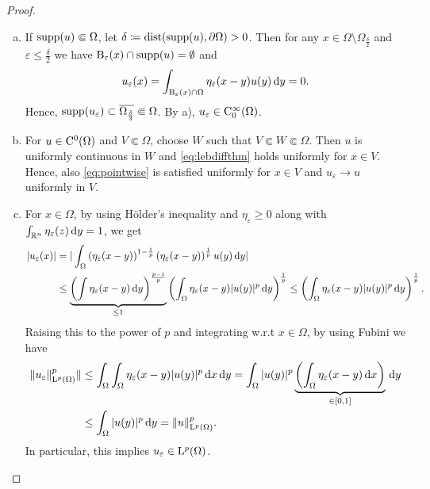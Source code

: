 \begin{proof}
\begin{enumerate}[a)]
    \item If $\operatorname{supp}(u) \Subset \Omega$, let $\delta \coloneqq \operatorname{dist}(\operatorname{supp}(u), \partial \Omega) > 0$.
    Then for any $x \in \Omega \setminus \Omega_{\frac{\delta}{2}}$ and $\varepsilon \leq \frac{\delta}{2}$ we have $\mathrm{B}_\varepsilon(x) \cap \operatorname{supp}(u) = \emptyset$ and 
    $$
    u_\varepsilon(x) = \int_{\mathrm{B}_\varepsilon(x) \cap \Omega} \eta_\varepsilon(x - y) u(y) \, {\operatorname{d}\!{y}} = 0.
    $$
    Hence, $\operatorname{supp}(u_\varepsilon) \subset \overline{\Omega_{\frac{\delta}{3}}} \Subset \Omega$.
    By a), $u_\varepsilon \in \mathrm{C}_0^\infty(\Omega)$.

    \item For $u \in \mathrm{C}^0(\Omega)$ and $V \Subset \Omega$, choose $W$ such that $V \Subset W \Subset \Omega$.
    Then $u$ is uniformly continuous in $W$ and \eqref{eq:lebdiffthm} holds uniformly for $x \in V$.
    Hence, also \eqref{eq:pointwise} is satisfied uniformly for $x \in V$ and $u_\varepsilon \to u$ uniformly in $V$.

    \item For $x \in \Omega$, by using Hölder's inequality and $\eta_\varepsilon \geq 0$ along with $\int_{\mathbb{R}^n} \eta_\varepsilon(z) \, {\operatorname{d}\!{y}} = 1$, we get
    \begin{align*}
      |u_\varepsilon(x)| 
      &= | \int_\Omega \left( \eta_\varepsilon(x - y) \right)^{1 - \frac{1}{p}} \left( \eta_\varepsilon(x - y)\right)^{\frac{1}{p}} u(y) \, {\operatorname{d}\!{y}} | \\
      &\leq \underbrace{\left( \int \eta_\varepsilon(x -y) \, {\operatorname{d}\!{y}}\right)^{\frac{p - 1}{p}}}_{\leq 1} \left( \int_\Omega \eta_\varepsilon(x - y) |u(y)|^p \, {\operatorname{d}\!{y}} \right)^\frac{1}{p}
      \leq \left( \int_\Omega \eta_\varepsilon (x - y) |u(y)|^p \, {\operatorname{d}\!{y}} \right)^{\frac{1}{p}}.
    \end{align*}
    Raising this to the power of $p$ and integrating w.r.t $x \in \Omega$, by using Fubini we have
    \begin{align}
      \|u_\varepsilon\|_{\mathrm{L}^p(\Omega)}^p \|
      &\leq \int_\Omega\int_\Omega \eta_\varepsilon(x - y) |u(y)|^p \, {\operatorname{d}\!{x}} \, {\operatorname{d}\!{y}}
      = \int_\Omega |u(y)|^p \underbrace{\left( \int_\Omega \eta_\varepsilon(x -y) \, {\operatorname{d}\!{x}} \right)}_{\in [0,1]} \, {\operatorname{d}\!{y}} \nonumber\\
      &\leq \int_\Omega |u(y)|^p \, {\operatorname{d}\!{y}} = \|u\|_{\mathrm{L}^p(\Omega)}^p.
      \label{eq:lpinequality}
    \end{align}
    In particular, this implies $u_\varepsilon \in \mathrm{L}^p(\Omega)$.


\end{enumerate}
\end{proof}
